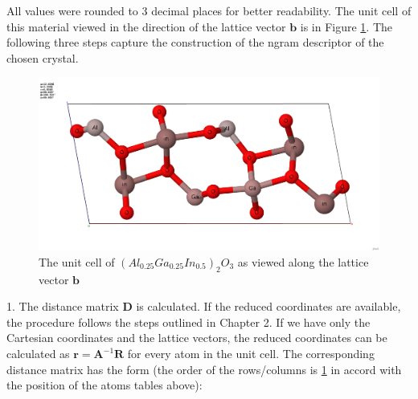 \documentclass[11pt,oneside,czech,american]{book} %
\theoremstyle{plain}
\theoremstyle{definition}
\begin{document}
All values were rounded to 3 decimal places for better readability. The unit cell of this material viewed in the direction of the lattice vector $\bm{b}$ is in Figure \ref{example}. The following three steps capture the construction of the ngram descriptor of the chosen crystal.
\begin{figure}[h]
	\centering
	\includegraphics[scale=0.23]{train_id_20_final_hotovo.png}
	\caption{The unit cell of $(Al_{0.25}Ga_{0.25}In_{0.5})_2 O_3$ as viewed along the lattice vector $\bm{b}$ \parencite{jmol}}
	\label{example}
\end{figure}

1. The distance matrix $\bm{D}$ is calculated. If the reduced coordinates are available, the procedure follows the steps outlined in Chapter 2. If we have only the Cartesian coordinates and the lattice vectors, the reduced coordinates can be calculated as $\bm{r} = \bm{A}^{-1} \bm{R}$ for every atom in the unit cell. The corresponding distance matrix has the form (the order of the rows/columns is \ref{example} in accord with the position of the atoms tables above):
\end{document}
